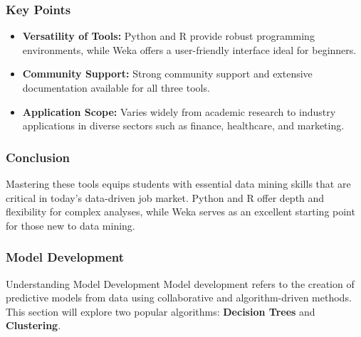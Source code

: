 \documentclass[aspectratio=169]{beamer}
\begin{document}
\begin{frame}
    \frametitle{Key Points}
    \begin{itemize}
        \item \textbf{Versatility of Tools:} 
        Python and R provide robust programming environments, while Weka offers a user-friendly interface ideal for beginners.
        
        \item \textbf{Community Support:} 
        Strong community support and extensive documentation available for all three tools.
        
        \item \textbf{Application Scope:} 
        Varies widely from academic research to industry applications in diverse sectors such as finance, healthcare, and marketing.
    \end{itemize}
\end{frame}

\begin{frame}
    \frametitle{Conclusion}
    Mastering these tools equips students with essential data mining skills that are critical in today's data-driven job market. Python and R offer depth and flexibility for complex analyses, while Weka serves as an excellent starting point for those new to data mining.
\end{frame}

\begin{frame}
    \frametitle{Model Development}
    \begin{block}{Understanding Model Development}
        Model development refers to the creation of predictive models from data using collaborative and algorithm-driven methods. This section will explore two popular algorithms: \textbf{Decision Trees} and \textbf{Clustering}.
    \end{block}
\end{frame}
\end{document}
